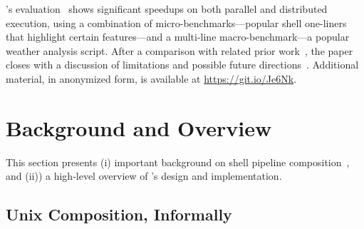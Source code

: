\documentclass[sigplan,10pt,review,anonymous]{acmart}
\begin{document}
\noindent
\sys's evaluation~ shows significant speedups on both parallel and distributed execution, using a combination of micro-bench\-marks---popular shell one-liners that highlight certain features---and a multi-line macro-benchmark---a popular weather analysis script.
After a comparison with related prior work~, the paper closes with a discussion of limitations and possible future directions~.
Additional material, in anonymized form, is available at
\href{https://git.io/Je6Nk}{https://git.io/Je6Nk}.

% 

\section{Background and Overview}
\label{bg}

This section presents (i) important background on shell pipeline composition~, and (ii)) a high-level overview of \sys's design and implementation.

\subsection{Unix Composition, Informally}
\label{bg:pipelines}
\end{document}
